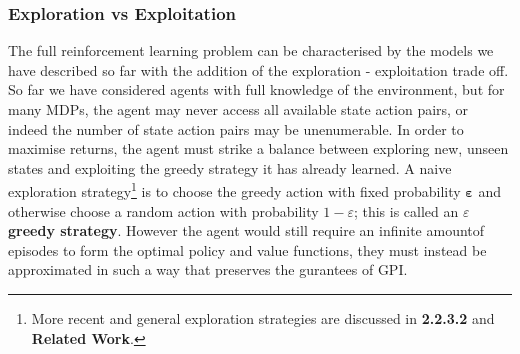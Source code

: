 \subsubsection{Exploration vs Exploitation}
The full reinforcement learning problem can be characterised by the models we have described so far
with the addition of the exploration - exploitation trade off. So far we have considered agents with full knowledge of the environment, but
for many MDPs, the agent may never access all available state action pairs, or indeed the number of state action
pairs may be unenumerable. In order to maximise returns, the agent must strike a balance between exploring new, unseen states and exploiting
the greedy strategy it has already learned. A naive exploration strategy\footnote{More recent and general exploration strategies are discussed
in \textbf{2.2.3.2} and \textbf{Related Work}.} is to choose the greedy action with fixed probability
$\mathbf{\varepsilon}$ and otherwise choose a random action with probability $1-\varepsilon$; this is called an
\textbf{$\varepsilon$ greedy strategy}. However the agent would still require an infinite
amountof episodes to form the optimal policy and value functions, they must instead be approximated
in such a way that preserves the gurantees of GPI.
